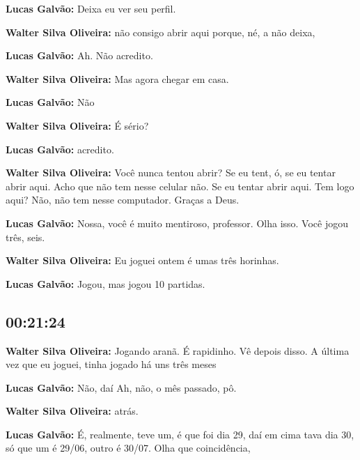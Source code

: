 \textbf{Lucas Galvão:} Deixa eu ver seu perfil.



\textbf{Walter Silva Oliveira:} não consigo abrir aqui porque, né, a não deixa,



\textbf{Lucas Galvão:} Ah. Não acredito.



\textbf{Walter Silva Oliveira:} Mas agora chegar em casa.



\textbf{Lucas Galvão:} Não



\textbf{Walter Silva Oliveira:} É sério?



\textbf{Lucas Galvão:} acredito.



\textbf{Walter Silva Oliveira:} Você nunca tentou abrir? Se eu tent, ó, se eu tentar abrir aqui. Acho que não tem nesse celular não. Se eu tentar abrir aqui. Tem logo aqui? Não, não tem nesse computador. Graças a Deus.



\textbf{Lucas Galvão:} Nossa, você é muito mentiroso, professor. Olha isso. Você jogou três, seis.



\textbf{Walter Silva Oliveira:} Eu joguei ontem é umas três horinhas.



\textbf{Lucas Galvão:} Jogou, mas jogou 10 partidas.



\subsection{\textbf{00:21:24}}



\textbf{Walter Silva Oliveira:} Jogando aranã. É rapidinho. Vê depois disso. A última vez que eu joguei, tinha jogado há uns três meses



\textbf{Lucas Galvão:} Não, daí Ah, não, o mês passado, pô.



\textbf{Walter Silva Oliveira:} atrás.



\textbf{Lucas Galvão:} É, realmente, teve um, é que foi dia 29, daí em cima tava dia 30, só que um é 29/06, outro é 30/07. Olha que coincidência,



